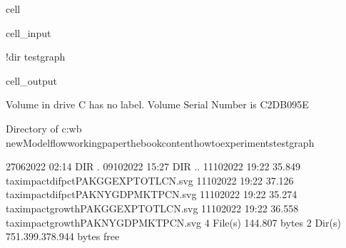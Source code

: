 \documentclass[letterpaper,10pt,english]{jupyterBook}
\begin{document}
\begin{sphinxuseclass}{cell}\begin{sphinxVerbatimInput}

\begin{sphinxuseclass}{cell_input}
\begin{sphinxVerbatim}[commandchars=\\\{\}]
!dir testgraph\PYGZbs{}
\end{sphinxVerbatim}

\end{sphinxuseclass}\end{sphinxVerbatimInput}
\begin{sphinxVerbatimOutput}

\begin{sphinxuseclass}{cell_output}
\begin{sphinxVerbatim}[commandchars=\\\{\}]
 Volume in drive C has no label.
 Volume Serial Number is C2DB\PYGZhy{}095E

 Directory of c:\PYGZbs{}wb new\PYGZbs{}Modelflow\PYGZbs{}working\PYGZus{}paper\PYGZbs{}thebook\PYGZbs{}content\PYGZbs{}howto\PYGZbs{}experiments\PYGZbs{}testgraph

27\PYGZhy{}06\PYGZhy{}2022  02:14    \PYGZlt{}DIR\PYGZgt{}          .
09\PYGZhy{}10\PYGZhy{}2022  15:27    \PYGZlt{}DIR\PYGZgt{}          ..
11\PYGZhy{}10\PYGZhy{}2022  19:22            35.849 tax\PYGZus{}impact\PYGZus{}difpct\PYGZus{}\PYGZus{}PAKGGEXPTOTLCN.svg
11\PYGZhy{}10\PYGZhy{}2022  19:22            37.126 tax\PYGZus{}impact\PYGZus{}difpct\PYGZus{}\PYGZus{}PAKNYGDPMKTPCN.svg
11\PYGZhy{}10\PYGZhy{}2022  19:22            35.274 tax\PYGZus{}impact\PYGZus{}growth\PYGZus{}\PYGZus{}PAKGGEXPTOTLCN.svg
11\PYGZhy{}10\PYGZhy{}2022  19:22            36.558 tax\PYGZus{}impact\PYGZus{}growth\PYGZus{}\PYGZus{}PAKNYGDPMKTPCN.svg
               4 File(s)        144.807 bytes
               2 Dir(s)  751.399.378.944 bytes free
\end{sphinxVerbatim}

\end{sphinxuseclass}\end{sphinxVerbatimOutput}

\end{sphinxuseclass}
\end{document}
